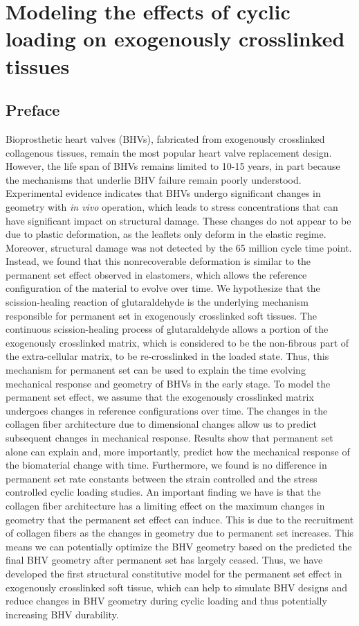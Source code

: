 \chapter{Modeling the effects of cyclic loading on exogenously crosslinked tissues}

\section*{Preface}
%

    Bioprosthetic heart valves (BHVs), fabricated from exogenously crosslinked collagenous tissues, remain the most popular heart valve replacement design. However, the life span of BHVs remains limited to 10-15 years, in part because the mechanisms that underlie BHV failure remain poorly understood. Experimental evidence indicates that BHVs undergo significant changes in geometry with \textit{in vivo} operation, which leads to stress concentrations that can have significant impact on structural damage. These changes do not appear to be due to plastic deformation, as the leaflets only deform in the elastic regime. Moreover, structural damage was not detected by the 65 million cycle time point. Instead, we found that this nonrecoverable deformation is similar to the permanent set effect observed in elastomers, which allows the reference configuration of the material to evolve over time. We hypothesize that the scission-healing reaction of glutaraldehyde is the underlying mechanism responsible for permanent set in exogenously crosslinked soft tissues. The continuous scission-healing process of glutaraldehyde allows a portion of the exogenously crosslinked matrix, which is considered to be the non-fibrous part of the extra-cellular matrix, to be re-crosslinked in the loaded state. Thus, this mechanism for permanent set can be used to explain the time evolving mechanical response and geometry of BHVs in the early stage. To model the permanent set effect, we assume that the exogenously crosslinked matrix undergoes changes in reference configurations over time. The changes in the collagen fiber architecture due to dimensional changes allow us to predict subsequent changes in mechanical response. Results show that permanent set alone can explain and, more importantly, predict how the mechanical response of the biomaterial change with time. Furthermore, we found is no difference in permanent set rate constants between the strain controlled and the stress controlled cyclic loading studies. An important finding we have is that the collagen fiber architecture has a limiting effect on the maximum changes in geometry that the permanent set effect can induce. This is due to the recruitment of collagen fibers as the changes in geometry due to permanent set increases. This means we can potentially optimize the BHV geometry based on the predicted the final BHV geometry after permanent set has largely ceased. Thus, we have developed the first structural constitutive model for the permanent set effect in exogenously crosslinked soft tissue, which can help to simulate BHV designs and reduce changes in BHV geometry during cyclic loading and thus potentially increasing BHV durability.
    
